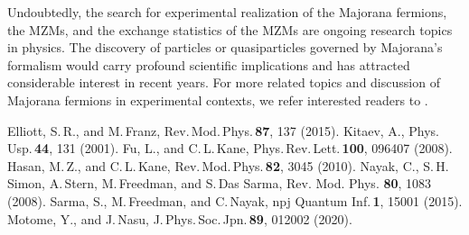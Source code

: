 \documentclass[11pt, oneside]{book}
\theoremstyle{break}
\theoremstyle{break}
\begin{document}
Undoubtedly, the search for experimental realization of the Majorana fermions, the MZMs, and the exchange statistics of the MZMs are ongoing research topics in physics. The discovery of particles or quasiparticles governed by Majorana's formalism would carry profound scientific implications and has attracted considerable interest in recent years. For more related topics and discussion of Majorana fermions in experimental contexts, we refer interested readers to \cite{Review, FuKane, HasanKane, Sankar, Motome}.

\begin{thebibliography}{9}
 Elliott, S.\,R., and M.\,Franz, Rev.\,Mod.\,Phys.\,\textbf{87}, 137 (2015).
 Kitaev, A., Phys.\,Usp.\,\textbf{44}, 131 (2001).
 Fu, L., and C.\,L.\,Kane, Phys.\,Rev.\,Lett.\,\textbf{100}, 096407 (2008).
 Hasan, M.\,Z., and C.\,L.\,Kane, Rev.\,Mod.\,Phys.\,\textbf{82}, 3045 (2010).
Nayak, C., S.\,H.\,Simon, A.\,Stern, M.\,Freedman, and S.\,Das Sarma, Rev. Mod. Phys. \textbf{80}, 1083 (2008).
Sarma, S., M.\,Freedman, and C.\,Nayak, npj Quantum Inf.\,\textbf{1}, 15001 (2015).
Motome, Y., and J.\,Nasu, J.\,Phys.\,Soc.\,Jpn.\,\textbf{89}, 012002 (2020).
\end{thebibliography}
\end{document}
